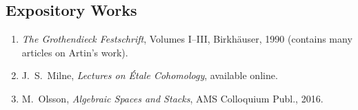 \subsection*{Expository Works}
\begin{enumerate}
    \item \textit{The Grothendieck Festschrift}, Volumes I--III, Birkh\"auser, 1990 (contains many articles on Artin's work).
    \item J.\ S.\ Milne, \textit{Lectures on \'Etale Cohomology}, available online.
    \item M.\ Olsson, \textit{Algebraic Spaces and Stacks}, AMS Colloquium Publ., 2016.
\end{enumerate}


